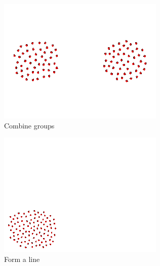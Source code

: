 \documentclass[]{article}
\begin{document}
\begin{figure}
	\ContinuedFloat
	\centering
	\begin{subfigure}{0.42\textwidth}
		\centering
		\includegraphics[width=\linewidth]{slide_images/Swarm_Robot_Control_-_100_Robot_0019.png}
		\caption{Combine groups}
		\label{fig:sub1}
	\end{subfigure}%
	\begin{subfigure}{0.42\textwidth}
		\centering
		\includegraphics[width=\linewidth]{slide_images/Swarm_Robot_Control_-_100_Robot_0021.png}
		\caption{Form a line}
		\label{fig:sub2}
	\end{subfigure}
	\begin{subfigure}{0.42\textwidth}
		\centering

\end{subfigure}
\end{figure}
\end{document}
